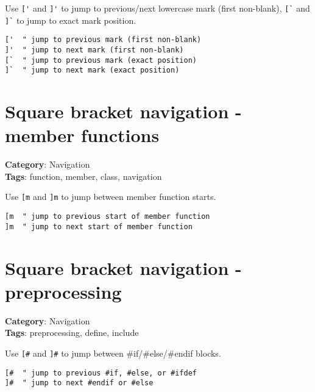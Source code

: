 {{{{{{{{{Use {\footnotesize \Verb§['§} and {\footnotesize \Verb§]'§} to jump to previous/next lowercase mark (first non-blank), {\footnotesize \Verb§[`§} and {\footnotesize \Verb§]`§} to jump to exact mark position.

\begin{Exa*}{}
\begin{Verbatim}[fontsize=\footnotesize, breaklines, breakanywhere]
['  " jump to previous mark (first non-blank)
]'  " jump to next mark (first non-blank)
[`  " jump to previous mark (exact position)
]`  " jump to next mark (exact position)
\end{Verbatim}
\end{Exa*}

\section{Square bracket navigation - member functions}

\textbf{Category}: Navigation\\ \textbf{Tags}: function, member, class, navigation
\vspace{0.5cm}

Use {\footnotesize \Verb§[m§} and {\footnotesize \Verb§]m§} to jump between member function starts.

\begin{Exa*}{}
\begin{Verbatim}[fontsize=\footnotesize, breaklines, breakanywhere]
[m  " jump to previous start of member function
]m  " jump to next start of member function
\end{Verbatim}
\end{Exa*}

\section{Square bracket navigation - preprocessing}

\textbf{Category}: Navigation\\ \textbf{Tags}: preprocessing, define, include
\vspace{0.5cm}

Use {\footnotesize \Verb§[#§} and {\footnotesize \Verb§]#§} to jump between \#if/\#else/\#endif blocks.

\begin{Exa*}{}
\begin{Verbatim}[fontsize=\footnotesize, breaklines, breakanywhere]
[#  " jump to previous #if, #else, or #ifdef
]#  " jump to next #endif or #else
\end{Verbatim}
\end{Exa*}

}}}}}}}}}
